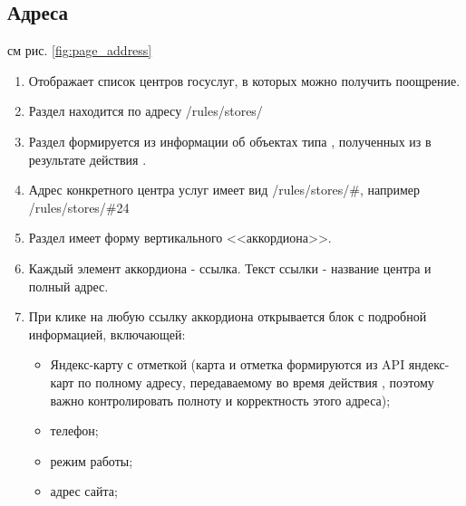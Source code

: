             
        \subsection{Адреса}
            \label{sec:page_address}
            
            см рис. \ref{fig:page_address}
            
            \begin{enumerate}
                \item Отображает список центров госуслуг, в которых можно 
                получить поощрение.
                \item Раздел находится по адресу /rules/stores/
                \item Раздел формируется из информации об объектах типа 
                , полученных из  в результате 
                действия .
                \item Адрес конкретного центра услуг имеет вид 
                /rules/stores/\#<ID центра>, например /rules/stores/\#24
                \item Раздел имеет форму вертикального <<аккордиона>>. 
                \item Каждый элемент аккордиона - ссылка. Текст ссылки - 
                    название центра и полный адрес.
                \item При клике на любую ссылку аккордиона открывается блок 
                    с подробной информацией, включающей:
                    \begin{itemize}
                        \item Яндекс-карту с отметкой (карта и отметка 
                            формируются 
                            из API яндекс-карт по полному адресу, 
                                передаваемому во время действия 
                            , поэтому важно контролировать 
                                полноту и корректность этого адреса);
                        \item телефон;
                        \item режим работы;
                        \item адрес сайта;
                    \end{itemize}
            \end{enumerate}
            
